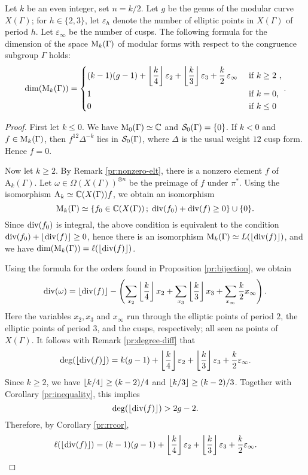 \begin{thm} \label{g-dimension-formula}
 Let $k$ be an even integer, set $n=k/2$. Let $g$ be the genus of the modular curve $X(\Gamma)$; for $h\in\{2,3\}$, let $\varepsilon_h$ denote the number of elliptic points in $X(\Gamma)$ of period $h$. Let $\varepsilon_\infty$ be the number of cusps. The following formula for the dimension of the space $\mathrm{M}_k(\Gamma)$ of modular forms with respect to the congruence subgroup $\Gamma$ holds:
 \[
  \dim(\mathrm{M}_k(\Gamma))=\begin{dcases}
                      (k-1)(g-1)+\left \lfloor \frac{k}{4} \right\rfloor\varepsilon_2+\left \lfloor \frac{k}{3} \right\rfloor\varepsilon_3+\frac{k}{2}\,\varepsilon_\infty & \text{ if $k\geq 2$ ,}\\
                      1 & \text{ if $k=0$,}\\
                      0 & \text{ if $k\leq 0$}
                     \end{dcases}.
 \]
\end{thm}
\begin{proof}
 First let $k\leq 0$. We have $\mathrm{M}_0(\Gamma)\simeq\mathbb{C}$ and $\mathcal{S}_0(\Gamma)=\{0\}$. If $k<0$ and $f\in\mathrm{M}_{k}(\Gamma)$, then $f^{12}\Delta^{-k}$ lies in $\mathcal{S}_0(\Gamma)$, where $\Delta$ is the usual weight $12$ cusp form. Hence $f=0$.
 
 Now let $k\geq 2$. By Remark \ref{pr:nonzero-elt}, there is a nonzero element $f$ of $\mathrm{A}_k(\Gamma)$. Let $\omega\in\Omega(X(\Gamma))^{\otimes n}$ be the preimage of $f$ under $\pi^*$. Using the isomorphism $\mathrm{A}_k\simeq\mathbb{C}(X(\Gamma))f$, we obtain an isomorphism
 \[
 \mathrm{M}_k(\Gamma)\simeq\{f_0\in\mathbb{C}(X(\Gamma))\,;\; \operatorname{div}(f_0)+\operatorname{div}(f)\geq 0\} \cup \{0\}.
 \]
 Since $\operatorname{div}(f_0)$ is integral, the above condition is equivalent to the condition $\operatorname{div}(f_0)+\left \lfloor \operatorname{div}(f) \right\rfloor\geq 0$, hence there is an isomorphism $\mathrm{M}_{k}(\Gamma)\simeq L(\left \lfloor \operatorname{div}(f) \right\rfloor)$, and we have $\dim(\mathrm{M}_k(\Gamma))=\ell(\left \lfloor \operatorname{div}(f) \right\rfloor)$.
 
 Using the formula for the orders found in Proposition \ref{pr:bijection}, we obtain
 \[
  \operatorname{div}(\omega)=\left \lfloor \operatorname{div}(f) \right\rfloor-\left(\sum_{x_2}\left \lfloor \frac{k}{4} \right\rfloor x_{2}+\sum_{x_{3}}\left \lfloor \frac{k}{3} \right\rfloor x_3+\sum_{x_{\infty}}\frac{k}{2}x_{\infty}\right).
 \]
 Here the variables $x_2, x_3$ and $x_\infty$ run through the elliptic points of period $2$, the elliptic points of period $3$, and the cusps, respectively; all seen as points of $X(\Gamma)$. It follows with Remark \ref{pr:degree-diff} that
 \[
  \deg(\left \lfloor \operatorname{div}(f) \right\rfloor)=k(g-1) + \left \lfloor \frac{k}{4} \right\rfloor\varepsilon_2 + \left \lfloor \frac{k}{3} \right\rfloor\varepsilon_3 + \frac{k}{2}\varepsilon_\infty.
 \]
 Since $k\geq 2$, we have $\left \lfloor k/4 \right\rfloor\geq(k-2)/4$ and $\left \lfloor k/3 \right\rfloor\geq(k-2)/3$. Together with Corollary \ref{pr:inequality}, this implies
 \[
  \deg(\left \lfloor \operatorname{div}(f) \right\rfloor)>2g-2.
 \]
 Therefore, by Corollary \ref{pr:rrcor},
 \[
  \ell(\left \lfloor \operatorname{div}(f) \right\rfloor)=(k-1)(g-1) + \left \lfloor \frac{k}{4} \right\rfloor\varepsilon_2 + \left \lfloor \frac{k}{3} \right\rfloor\varepsilon_3 + \frac{k}{2}\varepsilon_\infty.
 \]
\end{proof}

